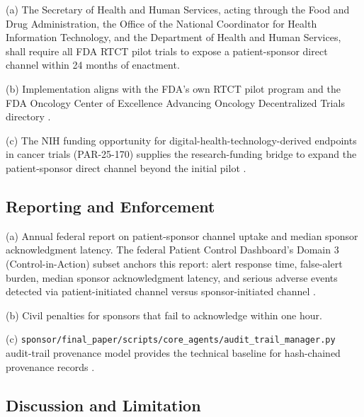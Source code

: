 \hspace{0.5cm} (a) The Secretary of Health and Human Services, acting through the
Food and Drug Administration, the Office of the National
Coordinator for Health Information Technology, and the Department
of Health and Human Services, shall require all FDA RTCT pilot
trials to expose a patient-sponsor direct channel within 24 months
of enactment.

(b) Implementation aligns with the FDA's own RTCT pilot program and
the FDA Oncology Center of Excellence Advancing Oncology
Decentralized Trials directory
\cite{fda_oce_advancing_oncology_dct_2024}.

(c) The NIH funding opportunity for digital-health-technology-derived endpoints in cancer trials (PAR-25-170) supplies the
research-funding bridge to expand the patient-sponsor direct
channel beyond the initial pilot
\cite{nih_par25_170_dht_endpoints}.

\subsection{Reporting and Enforcement}

\hspace{0.5cm} (a) Annual federal report on patient-sponsor channel uptake and
median sponsor acknowledgment latency. The federal Patient Control
Dashboard's Domain 3 (Control-in-Action) subset anchors this
report: alert response time, false-alert burden, median sponsor
acknowledgment latency, and serious adverse events detected via
patient-initiated channel versus sponsor-initiated channel
\cite{rocque2025remote_symptom_monitoring}.

(b) Civil penalties for sponsors that fail to acknowledge within
one hour.

(c) 
\texttt{sponsor/final\_paper/scripts/core\_agents/audit\_trail\_manager.py} audit-trail provenance model
provides the technical baseline for hash-chained provenance records
\cite{kawchak_2026_19396256}.

\subsection{Discussion and Limitation}

